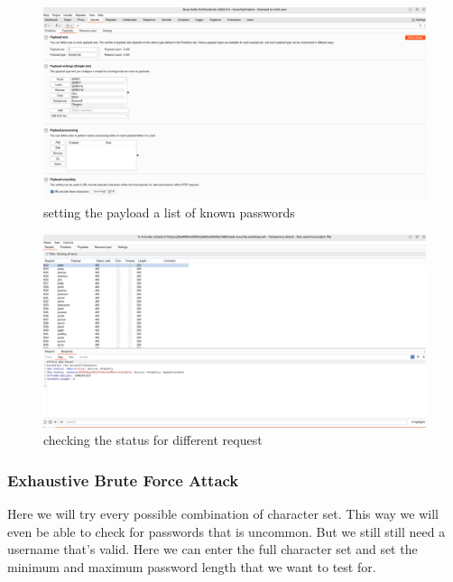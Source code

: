 \documentclass[
	a4paper, %
	12pt, %
]{CSSullivanBusinessReport}
\begin{document}
\begin{fullwidth}
\begin{fullwidth}
\begin{figure}[H]
    \centering
    \includegraphics[width=1\textwidth]{Images/anikaScreensots/dictionary1.png}
    \caption{setting the payload a list of known passwords}
    \label{fig:enter-label}
\end{figure}

\begin{figure}[H]
    \centering
    \includegraphics[width=1\textwidth]{Images/anikaScreensots/dictionary2.png}
    \caption{checking the status for different request}
    \label{fig:enter-label}
\end{figure}



\end{fullwidth}
\subsubsection*{Exhaustive Brute Force Attack}
\begin{fullwidth}
    Here we will try every possible combination of character set. This way we will even be able to check for passwords that is uncommon. But we still still need a username that’s valid. Here we can enter the full character set and set the minimum and maximum password length that we want to test for.


\end{fullwidth}
\end{fullwidth}
\end{document}
